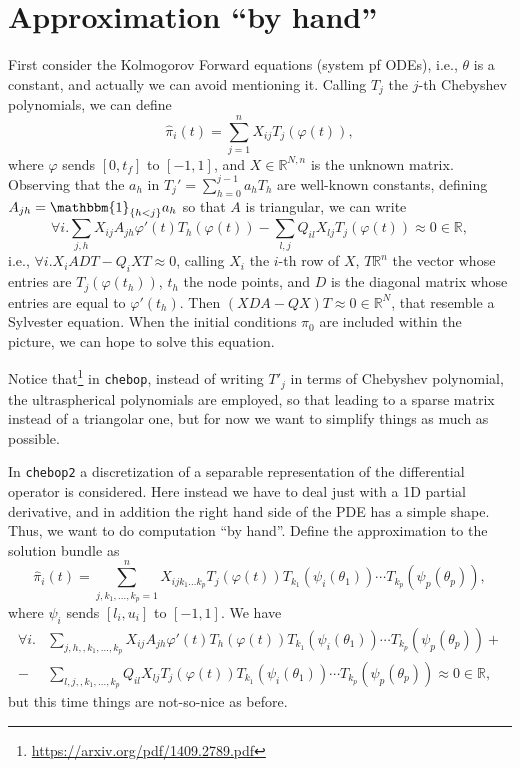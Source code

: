 \documentclass[]{article}
\begin{document}
\section{Approximation ``by hand''}
First consider the Kolmogorov Forward equations (system pf ODEs), i.e.,
$\theta$ is a constant, and actually we can avoid mentioning it.
Calling $T_j$ the $j$-th Chebyshev polynomials, we can define
\begin{equation}
\label{eq:hatpi1d}
\hat{\pi}_i(t) = \sum_{j=1}^n X_{ij}T_j(\varphi(t)),
\end{equation}
where $\varphi$ sends $[0,t_f]$ to $[-1,1]$, and $X\in\mathbb R^{N,n}$ is the
unknown matrix.
Observing that the $a_h$ in $T_j'=\sum_{h=0}^{j-1}a_hT_h$ are well-known constants,
defining $A_{jh}=\mathbbm{1}_{\{h<j\}}a_h$ so that $A$ is triangular, we can write
\[
\forall i. \sum_{j,h}X_{ij}A_{jh}\varphi'(t)T_h(\varphi(t))
-\sum_{l,j}Q_{il}X_{lj}T_j(\varphi(t))\approx 0\in\mathbb R,
\] 
i.e., $\forall i.X_iADT-Q_iXT\approx 0$, calling $X_i$ the $i$-th row of $X$,
$T\mathbb R^{n}$ the vector whose entries are $T_j(\varphi(t_h))$,
$t_h$ the node points, and $D$ is the diagonal matrix whose entries are
equal to $\varphi'(t_h)$. 
Then $(XDA-QX)T\approx 0\in\mathbb R^N$, that resemble a Sylvester equation.
When the initial conditions $\pi_0$ are included within the picture,
we can hope to solve this equation. 

Notice that\footnote{\url{https://arxiv.org/pdf/1409.2789.pdf}} 
in \texttt{chebop}, instead of writing $T'_j$ in terms of Chebyshev polynomial, 
the ultraspherical polynomials are employed, so that leading to a sparse matrix
instead of a triangolar one, but for now we want to simplify things as much as possible.

In \texttt{chebop2} a discretization of a separable representation of the
differential operator is considered. Here instead we have to deal just with a
1D partial derivative, and in addition the right hand side of the PDE has
a simple shape. Thus, we want to do computation ``by hand''.
Define the approximation to the solution bundle as
\begin{equation}
\label{eq:hatpi}
\hat{\pi}_i(t) = \sum_{j,k_1,\dots,k_p=1}^n 
X_{ijk_1\dots k_p}T_j(\varphi(t))
T_{k_1}(\psi_i(\theta_1))\cdots T_{k_p}(\psi_p(\theta_p)),
\end{equation}
where $\psi_i$ sends $[l_i,u_i]$ to $[-1,1]$. We have
\begin{align*}
\forall i. &\sum_{j,h,,k_1,\dots,k_p}X_{ij}A_{jh}\varphi'(t)T_h(\varphi(t))
T_{k_1}(\psi_i(\theta_1))\cdots T_{k_p}(\psi_p(\theta_p))+\\
-&\sum_{l,j,,k_1,\dots,k_p}Q_{il}X_{lj}T_j(\varphi(t))T_{k_1}(\psi_i(\theta_1))\cdots T_{k_p}(\psi_p(\theta_p))
\approx 0\in\mathbb R,
\end{align*}
but this time things are not-so-nice as before.
\end{document}
